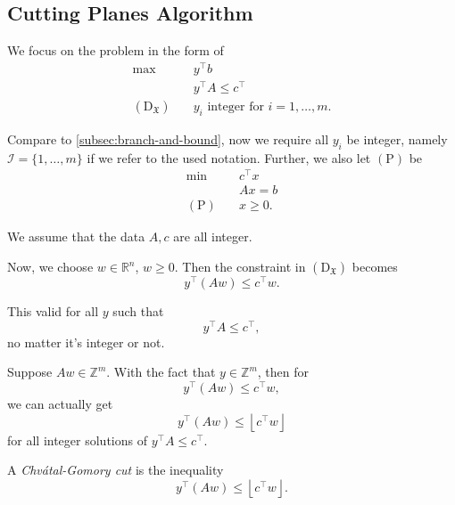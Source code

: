 \subsection{Cutting Planes Algorithm}
We focus on the problem in the form of
\[
	\begin{aligned}
		\max~                             & y^{\top}b                                   \\
		                                  & y^{\top}A\leq c^{\top}                      \\
		(\mathrm{D}_{\mathfrak{X} })\quad & y_{i}\text{ integer for }i = 1, \ldots , m.
	\end{aligned}
\]
\begin{note}
	Compare to \autoref{subsec:branch-and-bound}, now we require all \(y_{i}\) be integer, namely \(\mathcal{I} = \{1, \ldots , m\}\) if we refer to the used notation. Further, we also let \((\mathrm{P})\) be
	\[
		\begin{aligned}
			\min~             & c^{\top}x \\
			                  & Ax = b    \\
			(\mathrm{P})\quad & x\geq 0.
		\end{aligned}
	\]
\end{note}

\begin{remark}
	We assume that the data \(A, c\) are all integer.
\end{remark}

Now, we choose \(w\in \mathbb{R}^n\), \(w\geq 0\). Then the constraint in \((\mathrm{D}_{\mathfrak{X}})\) becomes
\[
	y^{\top}(Aw) \leq c^{\top}w.
\]

\begin{remark}
	This valid for all \(y\) such that
	\[
		y^{\top}A\leq c^{\top},
	\]
	no matter it's integer or not.
\end{remark}

Suppose \(Aw\in\mathbb{Z}^m\). With the fact that \(y\in \mathbb{Z}^m\), then for
\[
	y^{\top}(Aw)\leq c^{\top}w,
\]
we can actually get
\[
	y^{\top}(Aw)\leq \left\lfloor c^{\top}w \right\rfloor
\]
for all integer solutions of \(y^{\top} A \leq c^{\top} \).

\begin{definition}\label{def:Chvatal-Gomory-cut}
	A \emph{Chvátal-Gomory cut} is the inequality
	\[
		y^{\top}(Aw)\leq \left\lfloor c^{\top}w \right\rfloor.
	\]
\end{definition}

